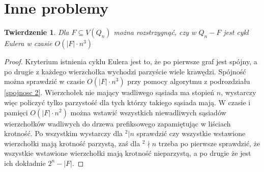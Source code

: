 \documentclass{pracamgr}
\newtheorem{theorem}{Twierdzenie}
\begin{document}
  \section{Inne problemy}
   \begin{theorem}\label{cykl Eulera}
    Dla $F\subseteq V(Q_n)$ można rozstrzygnąć, czy w $Q_n-F$ jest cykl Eulera w czasie $O(|F|\cdot n^3)$
   \end{theorem}
   \begin{proof}
    Kryterium istnienia cyklu Eulera jest to, że po pierwsze graf jest spójny, a po drugie z każdego wierzchołka wychodzi parzyście wiele krawędzi.
    Spójność można sprawdzić w czasie $O(|F|\cdot n^3)$ przy pomocy algorytmu z podrozdziału \ref{spojnosc 2}.
    Wierzchołek nie mający wadliwego sąsiada ma stopień $n$, wystarczy więc policzyć tylko parzystość dla tych którzy takiego sąsiada mają.
    W czasie i pamięci $O(|F|\cdot n^2)$ można wstawić wszystkich niewadliwych sąsiadów wierzchołków wadliwych
    do drzewa prefiksowego zapamiętując w liściach krotność.
    Po wszystkim wystarczy dla $^2|n$ sprawdzić czy wszystkie wstawione wierzchołki mają krotność parzystą, zaś dla $^2\nmid n$ trzeba po pierwsze sprawdzić,
    że wszystkie wstawione wierzchołki mają krotność nieparzystą, a po drugie że jest ich dokładnie $2^n-|F|$.
   \end{proof}

  
\end{document}
